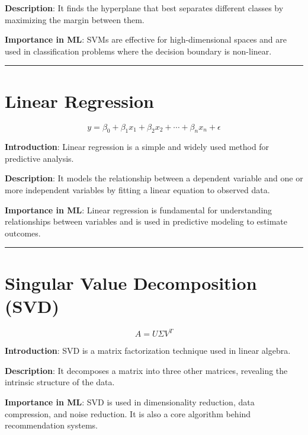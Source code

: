 \documentclass[
  12 pt,
  a4paper,
]{book}
\numberwithin{equation}{section}
\theoremstyle{plain}      %
\theoremstyle{definition} %
\theoremstyle{remark}     %
\theoremstyle{note}         %
\begin{document}
\textbf{Description}: It finds the hyperplane that best separates
different classes by maximizing the margin between them.

\textbf{Importance in ML}: SVMs are effective for high-dimensional
spaces and are used in classification problems where the decision
boundary is non-linear.

\begin{center}\rule{0.5\linewidth}{0.5pt}\end{center}

\newpage

\hypertarget{linear-regression}{%
\chapter{Linear Regression}\label{linear-regression}}

\[
y = \beta_0 + \beta_1 x_1 + \beta_2 x_2 + \cdots + \beta_n x_n + \epsilon
\]

\textbf{Introduction}: Linear regression is a simple and widely used
method for predictive analysis.

\textbf{Description}: It models the relationship between a dependent
variable and one or more independent variables by fitting a linear
equation to observed data.

\textbf{Importance in ML}: Linear regression is fundamental for
understanding relationships between variables and is used in predictive
modeling to estimate outcomes.

\begin{center}\rule{0.5\linewidth}{0.5pt}\end{center}

\newpage

\hypertarget{singular-value-decomposition-svd}{%
\chapter{Singular Value Decomposition
(SVD)}\label{singular-value-decomposition-svd}}

\[
A = U \Sigma V^T
\]

\textbf{Introduction}: SVD is a matrix factorization technique used in
linear algebra.

\textbf{Description}: It decomposes a matrix into three other matrices,
revealing the intrinsic structure of the data.

\textbf{Importance in ML}: SVD is used in dimensionality reduction, data
compression, and noise reduction. It is also a core algorithm behind
recommendation systems.
\end{document}
